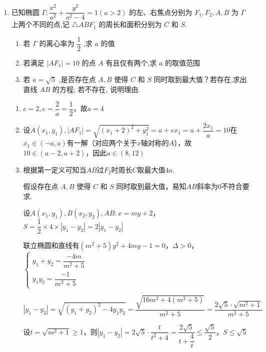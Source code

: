 \begin{enumerate}
\begin{enumerate}
        \item 已知椭圆 $\Gamma  : \dfrac{{x}^{2}}{{a}^{2}} + \dfrac{{y}^{2}}{{a}^{2} - 4} = 1\left( {a > 2}\right)$ 的左、右焦点分别为 ${F}_{1},{F}_{2},A,B$ 为 $\Gamma$ 上两个不同的点,记 $\bigtriangleup  {AB}{F}_{1}$ 的周长和面积分别为 $C$ 和 $S$.
        \begin{enumerate}
            \item 若 $\Gamma$ 的离心率为 $\dfrac{1}{2}$ ,求 $a$ 的值
            \item 若满足 $\left| {A{F}_{1}}\right|  = {10}$ 的点 $A$ 有且仅有两个,求 $a$ 的取值范围
            \item 若 $a = \sqrt{5}$ ,是否存在点 $A,B$ 使得 $C$ 和 $S$ 同时取到最大值？若存在,求出直线 ${AB}$ 的方程; 若不存在, 说明理由.
        \end{enumerate}
        \begin{jieda}
            \begin{enumerate}
                \item $c = 2, e = \dfrac{2}{a} = \dfrac{1}{2}$，故$a = 4$
                \item 设$A(x_1, y_1), \left| {A{F}_{1}}\right|  = \sqrt{(x_1+2)^2+y_1^2} = a+ex_1  = a + \dfrac{2x_1}{a} = 10$在$x_1 \in (-a, a)$有一解（对应两个关于$x$轴对称的$A$），故$10 \in (a-2, a+2)$，因此$a \in (8, 12)$
                \item 根据第一定义可知当$AB$过$F_2$时周长$C$取最大值$4a$. 
                
                假设存在点 $A,B$ 使得 $C$ 和 $S$ 同时取到最大值，易知$AB$斜率为0不符合要求.
                
                设$A(x_1, y_1), B(x_2, y_2), AB: x = my + 2$，$S = \dfrac{1}{2} \times 4 \times |y_1-y_2| = 2|y_1 - y_2|$

                联立椭圆和直线有$(m^2+5)y^2+4my-1 = 0$，$\Delta > 0$，$\left\{\begin{array}{l}
                    y_1+y_2 = \dfrac{-4m}{m^2+5} \\
                    y_1y_2 = \dfrac{-1}{m^2+5}
                \end{array}\right.$

                $|y_1-y_2| = \sqrt{(y_1+y_2)^2-4y_1y_2} = \dfrac{\sqrt{16m^2 + 4(m^2+5)}}{m^2+5} = \dfrac{2\sqrt{5} \cdot \sqrt{m^2+1}}{m^2+5}$

                设$t = \sqrt{m^2+1} \geq 1$，则$|y_1-y_2| = 2\sqrt{5} \cdot \dfrac{t}{t^2+4} = \dfrac{2\sqrt{5}}{t+\dfrac{4}{t}} \leq \dfrac{\sqrt{5}}{2}$，$S \leq \sqrt{5}$


\end{enumerate}
\end{jieda}
\end{enumerate}
\end{enumerate}

